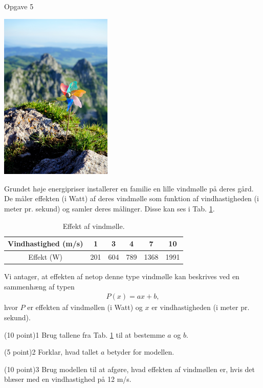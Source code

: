 \begin{opgavetekst}{Opgave 5}
	\begin{center}
		\includegraphics[width=0.4\textwidth]{Billeder/windmill.jpg}
	\end{center}
	Grundet høje energipriser installerer en familie en lille vindmølle på deres gård. De måler effekten (i Watt) af deres vindmølle som funktion af vindhastigheden 
	(i meter pr. sekund) og samler deres 
	målinger. Disse kan ses i Tab. \ref{tab:vind}.
	\begin{table}[H]
		\centering
		\begin{tabular}{c|c|c|c|c|c}
			Vindhastighed (m/s) & 1 & 3 & 4 & 7 & 10 \\
			\hline
			Effekt (W) & 201 & 604 & 789 & 1368 & 1991 
		\end{tabular}
		\caption{Effekt af vindmølle.}
		\label{tab:vind}
	\end{table}
	Vi antager, at effekten af netop denne type vindmølle kan beskrives ved en sammenhæng af typen
	\begin{align*}
		P(x) = ax+b,
	\end{align*}
	hvor $P$ er effekten af vindmøllen (i Watt) og $x$ er vindhastigheden (i meter pr. sekund).
\end{opgavetekst}
\begin{delopgave}{(10 point)}{1}
	Brug tallene fra Tab. \ref{tab:vind} til at bestemme $a$ og $b$. 
\end{delopgave}
\begin{delopgave}{(5 point)}{2}
	Forklar, hvad tallet $a$ betyder for modellen. 
\end{delopgave}
\begin{delopgave}{(10 point)}{3}
	Brug modellen til at afgøre, hvad effekten af vindmøllen er, hvis det blæser med en vindhastighed på 12 m/s.
\end{delopgave}

